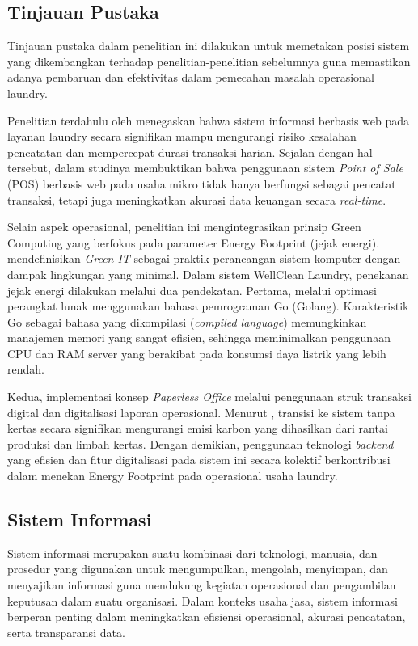 
\vspace{1cm}
\subsection{Tinjauan Pustaka}
\indent
Tinjauan pustaka dalam penelitian ini dilakukan untuk memetakan posisi sistem yang dikembangkan terhadap penelitian-penelitian sebelumnya guna memastikan adanya pembaruan dan efektivitas dalam pemecahan masalah operasional laundry.

Penelitian terdahulu oleh \cite{Achyani2024} menegaskan bahwa sistem informasi berbasis web pada layanan laundry secara signifikan mampu mengurangi risiko kesalahan pencatatan dan mempercepat durasi transaksi harian. Sejalan dengan hal tersebut, \cite{Singh2022} dalam studinya membuktikan bahwa penggunaan sistem \textit{Point of Sale} (POS) berbasis web pada usaha mikro tidak hanya berfungsi sebagai pencatat transaksi, tetapi juga meningkatkan akurasi data keuangan secara \textit{real-time}.

Selain aspek operasional, penelitian ini mengintegrasikan prinsip Green Computing yang berfokus pada parameter Energy Footprint (jejak energi). \cite{Murugesan2012harnessing} mendefinisikan \textit{Green IT} sebagai praktik perancangan sistem komputer dengan dampak lingkungan yang minimal. Dalam sistem WellClean Laundry, penekanan jejak energi dilakukan melalui dua pendekatan. Pertama, melalui optimasi perangkat lunak menggunakan bahasa pemrograman Go (Golang). Karakteristik Go sebagai bahasa yang dikompilasi (\textit{compiled language}) memungkinkan manajemen memori yang sangat efisien, sehingga meminimalkan penggunaan CPU dan RAM server yang berakibat pada konsumsi daya listrik yang lebih rendah.

Kedua, implementasi konsep \textit{Paperless Office} melalui penggunaan struk transaksi digital dan digitalisasi laporan operasional. Menurut \cite{Kim2021}, transisi ke sistem tanpa kertas secara signifikan mengurangi emisi karbon yang dihasilkan dari rantai produksi dan limbah kertas. Dengan demikian, penggunaan teknologi \textit{backend} yang efisien dan fitur digitalisasi pada sistem ini secara kolektif berkontribusi dalam menekan Energy Footprint pada operasional usaha laundry.

\subsection{Sistem Informasi}
\indent
Sistem informasi merupakan suatu kombinasi dari teknologi, manusia, dan prosedur yang digunakan untuk mengumpulkan, mengolah, menyimpan, dan menyajikan informasi guna mendukung kegiatan operasional dan pengambilan keputusan dalam suatu organisasi. Dalam konteks usaha jasa, sistem informasi berperan penting dalam meningkatkan efisiensi operasional, akurasi pencatatan, serta transparansi data.

